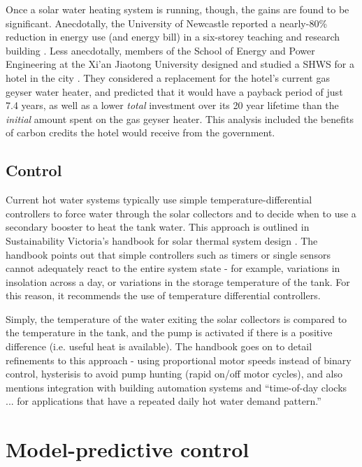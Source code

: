 Once a solar water heating system is running, though, the gains are found to be significant.
Anecdotally, the University of Newcastle reported a nearly-80\% reduction in energy use (and energy bill) in a six-storey teaching and research building \cite{ApricusNewcastle}.
Less anecdotally, members of the School of Energy and Power Engineering at the Xi'an Jiaotong University designed and studied a SHWS for a hotel in the city \cite{Cao14}.
They considered a replacement for the hotel's current gas geyser water heater, and predicted that it would have a payback period of just 7.4 years, as well as a lower {\it total} investment over its 20 year lifetime than the {\it initial} amount spent on the gas geyser heater.
This analysis included the benefits of carbon credits the hotel would receive from the government.


\subsection{Control}

Current hot water systems typically use simple temperature-differential controllers to force water through the solar collectors and to decide when to use a secondary booster to heat the tank water.
This approach is outlined in Sustainability Victoria's handbook for solar thermal system design \cite{LSTS}.
The handbook points out that simple controllers such as timers or single sensors cannot adequately react to the entire system state - for example, variations in insolation across a day, or variations in the storage temperature of the tank.
For this reason, it recommends the use of temperature differential controllers.

Simply, the temperature of the water exiting the solar collectors is compared to the temperature in the tank, and the pump is activated if there is a positive difference (i.e. useful heat is available).
The handbook goes on to detail refinements to this approach - using proportional motor speeds instead of binary control, hysterisis to avoid pump hunting (rapid on/off motor cycles), and also mentions integration with building automation systems and ``time-of-day clocks ... for applications that have a repeated daily hot water demand pattern.''

\section{Model-predictive control}

